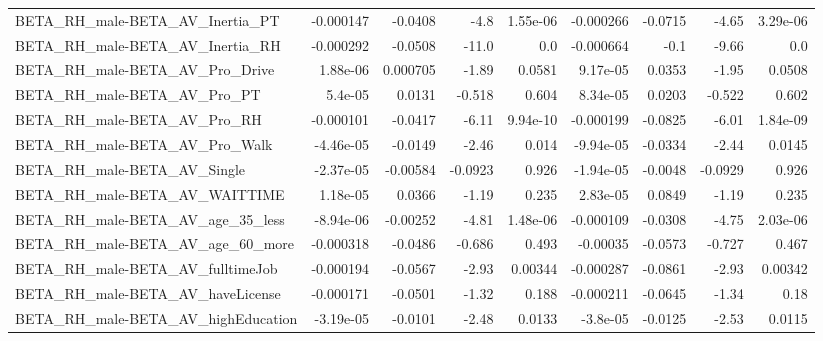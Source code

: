 \begin{tabular}{lrrrrrrrr}
BETA\_RH\_male-BETA\_AV\_Inertia\_PT                    &   -0.000147 &      -0.0408 &     -4.8 & 1.55e-06 &  -0.000266 &     -0.0715 &        -4.65 &      3.29e-06 \\
BETA\_RH\_male-BETA\_AV\_Inertia\_RH                    &   -0.000292 &      -0.0508 &    -11.0 &      0.0 &  -0.000664 &        -0.1 &        -9.66 &           0.0 \\
BETA\_RH\_male-BETA\_AV\_Pro\_Drive                     &    1.88e-06 &     0.000705 &    -1.89 &   0.0581 &   9.17e-05 &      0.0353 &        -1.95 &        0.0508 \\
BETA\_RH\_male-BETA\_AV\_Pro\_PT                        &     5.4e-05 &       0.0131 &   -0.518 &    0.604 &   8.34e-05 &      0.0203 &       -0.522 &         0.602 \\
BETA\_RH\_male-BETA\_AV\_Pro\_RH                        &   -0.000101 &      -0.0417 &    -6.11 & 9.94e-10 &  -0.000199 &     -0.0825 &        -6.01 &      1.84e-09 \\
BETA\_RH\_male-BETA\_AV\_Pro\_Walk                      &   -4.46e-05 &      -0.0149 &    -2.46 &    0.014 &  -9.94e-05 &     -0.0334 &        -2.44 &        0.0145 \\
BETA\_RH\_male-BETA\_AV\_Single                        &   -2.37e-05 &     -0.00584 &  -0.0923 &    0.926 &  -1.94e-05 &     -0.0048 &      -0.0929 &         0.926 \\
BETA\_RH\_male-BETA\_AV\_WAITTIME                      &    1.18e-05 &       0.0366 &    -1.19 &    0.235 &   2.83e-05 &      0.0849 &        -1.19 &         0.235 \\
BETA\_RH\_male-BETA\_AV\_age\_35\_less                   &   -8.94e-06 &     -0.00252 &    -4.81 & 1.48e-06 &  -0.000109 &     -0.0308 &        -4.75 &      2.03e-06 \\
BETA\_RH\_male-BETA\_AV\_age\_60\_more                   &   -0.000318 &      -0.0486 &   -0.686 &    0.493 &   -0.00035 &     -0.0573 &       -0.727 &         0.467 \\
BETA\_RH\_male-BETA\_AV\_fulltimeJob                   &   -0.000194 &      -0.0567 &    -2.93 &  0.00344 &  -0.000287 &     -0.0861 &        -2.93 &       0.00342 \\
BETA\_RH\_male-BETA\_AV\_haveLicense                   &   -0.000171 &      -0.0501 &    -1.32 &    0.188 &  -0.000211 &     -0.0645 &        -1.34 &          0.18 \\
BETA\_RH\_male-BETA\_AV\_highEducation                 &   -3.19e-05 &      -0.0101 &    -2.48 &   0.0133 &   -3.8e-05 &     -0.0125 &        -2.53 &        0.0115 \\

\end{tabular}
